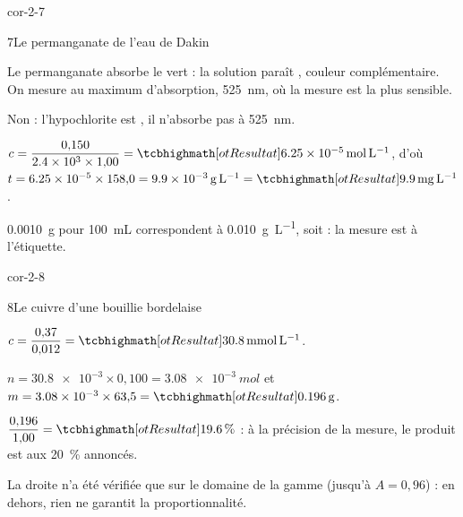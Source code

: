 \begin{blocLivre}{cor-2-7}
\begin{corrige}{7}{Le permanganate de l'eau de Dakin}
\begin{questions}
\item Le permanganate absorbe le vert : la solution paraît , couleur complémentaire. On mesure au maximum d'absorption,
\qty{525}{nm}, où la mesure est la plus sensible.
\item Non : l'hypochlorite est , il n'absorbe pas à \qty{525}{nm}.
\item $c=\dfrac{0{,}150}{\num{2.4e3}\times1{,}00}=\res{\qty{6,25e-5}{mol.L^{-1}}}$, d'où $t=\num{6.25e-5}\times158{,}0=\qty{9,9e-3}{g.L^{-1}}=\res{\qty{9,9}{mg.L^{-1}}}$.
\item \qty{0,0010}{g} pour \qty{100}{mL} correspondent à \qty{0,010}{g.L^{-1}}, soit  : la mesure est  à l'étiquette.
\end{questions}
\end{corrige}
\end{blocLivre}
\begin{blocLivre}{cor-2-8}
\begin{corrige}{8}{Le cuivre d'une bouillie bordelaise}
\begin{questions}
\item $c=\dfrac{0{,}37}{0{,}012}=\res{\qty{30,8}{mmol.L^{-1}}}$.
\item $n=\num{30.8e-3}\times0{,}100=\qty{3,08e-3}{mol}$ et $m=\num{3.08e-3}\times63{,}5=\res{\qty{0,196}{g}}$.
\item $\dfrac{0{,}196}{1{,}00}=\res{\qty{19,6}{\percent}}$ : à la précision de la mesure, le produit est  aux 20~\% annoncés.
\item La droite n'a été vérifiée que sur le domaine de la gamme (jusqu'à $A=0{,}96$) : en dehors, rien ne garantit la
proportionnalité.
\end{questions}
\end{corrige}
\end{blocLivre}
